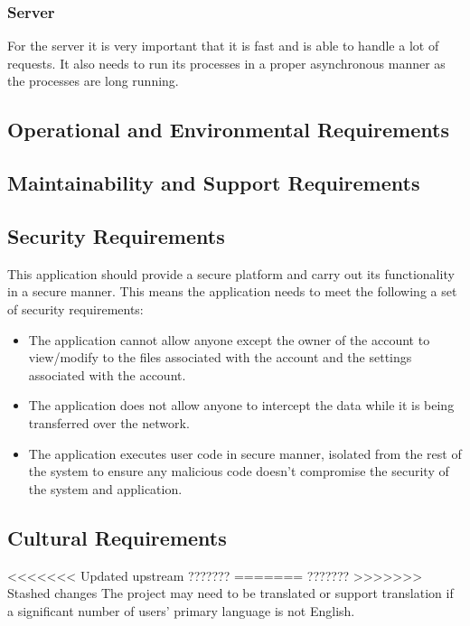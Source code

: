 \documentclass[12pt, titlepage]{article}
\begin{document}
    \subsubsection{Server}
    For the server it is very important that it is fast and is able to handle 
    a lot of requests. It also needs to run its processes in a proper 
    asynchronous manner as the processes are long running.

  \subsection{Operational and Environmental Requirements}

  \subsection{Maintainability and Support Requirements}

  \subsection{Security Requirements}
  This application should provide a secure platform and carry out its
  functionality in a secure manner. This means the application needs to meet
  the following a set of security requirements:
  \begin{itemize}
    \item The application cannot allow anyone except the owner of the account
      to view/modify to the files associated with the account and the settings
      associated with the account.
    \item The application does not allow anyone to intercept the data while it
      is being transferred over the network.
    \item The application executes user code in secure manner, isolated from
      the rest of the system to ensure any malicious code doesn't compromise
      the security of the system and application.
  \end{itemize}

  \subsection{Cultural Requirements}
<<<<<<< Updated upstream
  {\huge ???????}
=======
  \Huge ???????
>>>>>>> Stashed changes
  The project may need to be translated or support translation if a significant
  number of users' primary language is not English.
\end{document}
